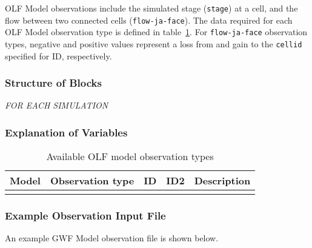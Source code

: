 
OLF Model observations include the simulated stage (\texttt{stage}) at a cell, and the flow between two connected cells (\texttt{flow-ja-face}). The data required for each OLF Model observation type is defined in table~\ref{table:olfobstype}. For \texttt{flow-ja-face} observation types, negative and positive values represent a loss from and gain to the \texttt{cellid} specified for ID, respectively.

\subsubsection{Structure of Blocks}
\vspace{5mm}

\noindent \textit{FOR EACH SIMULATION}



\subsubsection{Explanation of Variables}
\begin{description}

\end{description}


\begin{longtable}{p{2cm} p{2.75cm} p{2cm} p{1.25cm} p{7cm}}
\caption{Available OLF model observation types} \tabularnewline

\hline
\hline
\textbf{Model} & \textbf{Observation type} & \textbf{ID} & \textbf{ID2} & \textbf{Description} \\
\hline
\endhead

\hline
\endfoot


\label{table:olfobstype}
\end{longtable}

\vspace{5mm}
\subsubsection{Example Observation Input File}

An example GWF Model observation file is shown below.



